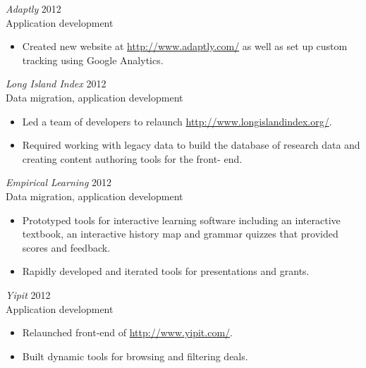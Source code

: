 \documentclass[line,margin]{res}
\begin{document}
\begin{resume}
\begin{itemize}
    \end{itemize}

    {\sl Adaptly}
    \hfill 2012 \\
    Application development
    \begin{itemize} \itemsep -2pt
        \item
            Created new website at \url{http://www.adaptly.com/} as well as
            set up custom tracking using Google Analytics.

    \end{itemize}

    {\sl Long Island Index}
    \hfill 2012 \\
    Data migration, application development
    \begin{itemize} \itemsep -2pt
        \item
            Led a team of developers to relaunch
            \url{http://www.longislandindex.org/}.

        \item
            Required working with legacy data to build the database of
            research data and creating content authoring tools for the front-
            end.

    \end{itemize}


    {\sl Empirical Learning}
    \hfill 2012 \\
    Data migration, application development
    \begin{itemize} \itemsep -2pt
        \item
            Prototyped tools for interactive learning software including an
            interactive textbook, an interactive history map and grammar
            quizzes that provided scores and feedback.

        \item
            Rapidly developed and iterated tools for presentations and grants.

    \end{itemize}


    \begin{samepage}
    {\sl Yipit}
    \hfill 2012 \\
    Application development
    \begin{itemize} \itemsep -2pt
        \item
            Relaunched front-end of \url{http://www.yipit.com/}.

        \item
            Built dynamic tools for browsing and filtering deals.


\end{itemize}
\end{samepage}
\end{resume}
\end{document}
